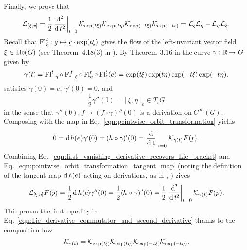 \documentclass[twoside,11pt]{article}
\begin{document}
    Finally, we prove that
    \begin{equation}
        {\mathcal{L}}_{[\xi, \eta]} 
        = \frac{1}{2}\left.\frac{\operatorname{\mathrm{d}}^2}{\operatorname{\mathrm{d}} t^2}\right\vert_{t=0} {\mathcal{K}}_{\exp(t\xi)}{\mathcal{K}}_{\exp(t\eta)}{\mathcal{K}}_{\exp(-t\xi)}{\mathcal{K}}_{\exp(-t\eta)}
        = {\mathcal{L}}_{\xi}{\mathcal{L}}_{\eta} - {\mathcal{L}}_{\eta}{\mathcal{L}}_{\xi}.
        \label{eqn:Lie_derivative_commutator_and_second_derivative}
    \end{equation}
    Recall that $\operatorname{Fl}_{\xi}^t: g \mapsto g \cdot \exp(t\xi)$ gives the flow of the left-invariant vector field $\xi\in\operatorname{Lie}(G)$ (see Theorem~4.18(3) in \cite{Kolar1993natural}).
    By Theorem~3.16 in \cite{Kolar1993natural} the curve $\gamma: \mathbb{R} \to G$ given by
    \begin{equation}
        \gamma(t) 
        = \operatorname{Fl}_{-\eta}^t \circ \operatorname{Fl}_{-\xi}^t \circ \operatorname{Fl}_{\eta}^t \circ \operatorname{Fl}_{\xi}^t(e)
        = \exp(t\xi)\exp(t\eta)\exp(-t\xi)\exp(-t\eta).
    \end{equation}
    satisfies $\gamma(0) = e$, $\gamma'(0) = 0$, and
    \begin{equation}
        \frac{1}{2}\gamma''(0) = [\xi, \eta]_e \in T_e G
        \label{eqn:first_vanishing_derivative_recovers_Lie_bracket}
    \end{equation}
    in the sense that $\gamma''(0): f \mapsto (f \circ \gamma)''(0)$ is a derivation on $C^{\infty}(G)$.
    Composing with the map in Eq.~\ref{eqn:pointwise_orbit_transformation} yields
    \begin{equation}
        0 = \operatorname{\mathrm{d}} h(e) \gamma'(0) 
        = (h\circ \gamma)'(0) 
        = \left.\operatorname{\frac{\operatorname{\mathrm{d}}}{\operatorname{\mathrm{d}} t}} \right\vert_{t=0} {\mathcal{K}}_{\gamma(t)} F(p).
        \label{eqn:vanishing_first_derivative_of_K_gamma}
    \end{equation}
    Combining Eq.~\ref{eqn:first_vanishing_derivative_recovers_Lie_bracket} and Eq.~\ref{eqn:pointwise_orbit_transformation_tangent_map} (noting the definition of the tangent map $\operatorname{\mathrm{d}} h(e)$ acting on derivations, as in \cite{Kolar1993natural}, \cite{Lee2013introduction}) gives
    \begin{equation}
        {\mathcal{L}}_{[\xi, \eta]} F(p)
        = \frac{1}{2} \operatorname{\mathrm{d}} h(e) \gamma''(0)
        = \frac{1}{2} (h\circ\gamma)''(0)
        = \frac{1}{2} \left.\frac{\operatorname{\mathrm{d}}^2}{\operatorname{\mathrm{d}} t^2}\right\vert_{t=0} {\mathcal{K}}_{\gamma(t)} F(p).
    \end{equation}
    This proves the first equality in Eq.~\ref{eqn:Lie_derivative_commutator_and_second_derivative} thanks to the composition law
    \begin{equation}
        {\mathcal{K}}_{\gamma(t)} = {\mathcal{K}}_{\exp(t\xi)}{\mathcal{K}}_{\exp(t\eta)}{\mathcal{K}}_{\exp(-t\xi)}{\mathcal{K}}_{\exp(-t\eta)}.
    \end{equation}
\end{document}
